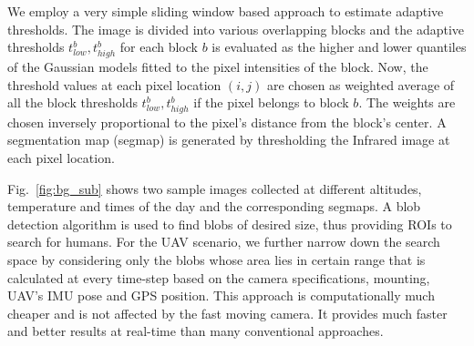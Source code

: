 \documentclass[runningheads]{llncs}
\begin{document}
We employ a very simple sliding window based approach to estimate adaptive thresholds. The image is divided into various overlapping blocks and the adaptive thresholds $t_{low}^b, t_{high}^b$ for each block $b$ is evaluated as the higher and lower quantiles of the Gaussian models fitted to the pixel intensities of the block. Now, the threshold values at each pixel location $(i, j)$ are chosen as weighted average of all the block thresholds $t_{low}^b, t_{high}^b$ if the pixel belongs to block $b$. The weights are chosen inversely proportional to the pixel's distance from the block's center. A segmentation map (segmap) is generated by thresholding the Infrared image at each pixel location.

Fig.~\ref{fig:bg_sub} shows two sample images collected at different altitudes, temperature and times of the day and the corresponding segmaps. A blob detection algorithm \cite{cvblob} is used to find blobs of desired size, thus providing ROIs to search for humans. For the UAV scenario, we further narrow down the search space by considering only the blobs whose area lies in certain range that is calculated at every time-step based on the camera specifications, mounting, UAV's IMU pose and GPS position. This approach is computationally much cheaper and is not affected by the fast moving camera. It provides much faster and better results at real-time than many conventional approaches.
\end{document}
